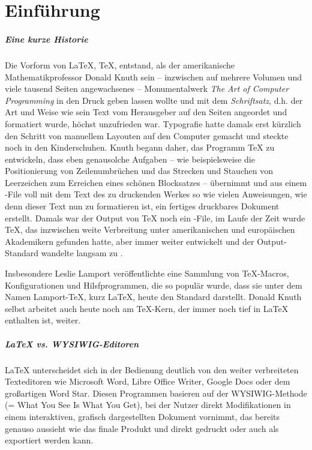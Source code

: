 \chapter{Einführung}

\paragraph{Eine kurze Historie}
Die Vorform von \LaTeX{}, \TeX{}, entstand, als der amerikanische Mathematikprofessor Donald Knuth sein -- inzwischen auf mehrere Volumen und viele tausend Seiten angewachsenes -- Monumentalwerk \emph{The Art of Computer Programming} in den Druck geben lassen wollte und mit dem \emph{Schriftsatz}, d.h. der Art und Weise wie sein Text vom Herausgeber auf den Seiten angeordet und formatiert wurde, höchst unzufrieden war.
Typografie hatte damals erst kürzlich den Schritt von manuellem Layouten auf den Computer gemacht und steckte noch in den Kinderschuhen.
Knuth begann daher, das Programm \TeX{} zu entwickeln, dass eben genausolche Aufgaben -- wie beispielsweise die Positionierung von Zeilenumbrüchen und das Strecken und Stauchen von Leerzeichen zum Erreichen eines schönen Blocksatzes -- übernimmt und aus einem -File voll mit dem Text des zu druckenden Werkes so wie vielen Anweisungen, wie denn dieser Text nun zu formatieren ist, ein fertiges druckbares Dokument erstellt.
Damals war der Output von \TeX{} noch ein -File, im Laufe der Zeit wurde \TeX{}, das inzwischen weite Verbreitung unter amerikanischen und europäischen Akademikern gefunden hatte, aber immer weiter entwickelt und der Output-Standard wandelte langsam zu .

Insbesondere Leslie Lamport veröffentlichte eine Sammlung von \TeX{}-Macros, Konfigurationen und Hilsfprogrammen, die so populär wurde, dass sie unter dem Namen Lamport-\TeX{}, kurz \LaTeX{}, heute den Standard darstellt.
Donald Knuth selbst arbeitet auch heute noch am \TeX{}-Kern, der immer noch tief in \LaTeX{} enthalten ist, weiter.

\paragraph{\LaTeX{} vs. WYSIWIG-Editoren}
\LaTeX{} unterscheidet sich in der Bedienung deutlich von den weiter verbreiteten Texteditoren wie Microsoft Word, Libre Office Writer, Google Docs oder dem großartigen Word Star.
Diesen Programmen basieren auf der WYSIWIG-Methode (= What You See Is What You Get), bei der Nutzer direkt Modifikationen in einem interaktiven, grafisch dargestellten Dokument vornimmt, das bereits genauso aussieht wie das finale Produkt und direkt gedruckt oder auch als  exportiert werden kann.

